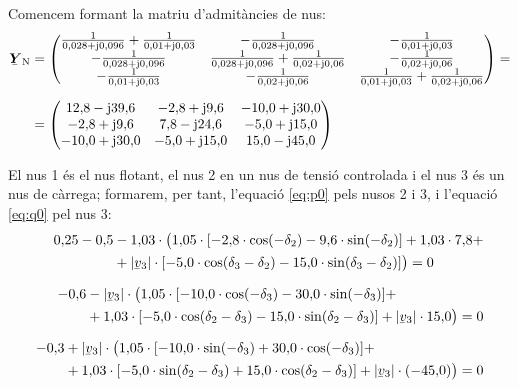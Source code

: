 \begin{exemple}
Comencem formant la matriu d'admit\`{a}ncies de nus:
\begin{align*}
\mcmplx{Y}\ped{N} &= \begin{pmatrix}
\frac{1}{0{,}028+\ju0{,}096} + \frac{1}{0{,}01+\ju0{,}03} & -\frac{1}{0{,}028+\ju0{,}096}  &  -\frac{1}{0{,}01+\ju0{,}03}\\
-\frac{1}{0{,}028+\ju0{,}096} & \frac{1}{0{,}028+\ju0{,}096} + \frac{1}{0{,}02+\ju0{,}06} &  -\frac{1}{0{,}02+\ju0{,}06}\\
-\frac{1}{0{,}01+\ju0{,}03} & -\frac{1}{0{,}02+\ju0{,}06} &
\frac{1}{0{,}01+\ju0{,}03} + \frac{1}{0{,}02+\ju0{,}06}
\end{pmatrix} = \\[1.5ex]
 &= \begin{pmatrix}
12{,}8 - \ju 39{,}6 & -2{,}8 + \ju 9{,}6 & -10{,}0 + \ju 30{,}0 \\
-2{,}8 + \ju 9{,}6 & 7{,}8 - \ju 24{,}6 & -5{,}0 + \ju 15{,}0 \\
-10{,}0 + \ju 30{,}0 & -5{,}0 + \ju 15{,}0 & 15{,}0 - \ju 45{,}0
\end{pmatrix}
\end{align*}

El nus 1 \'{e}s el nus flotant, el nus 2 en un nus de tensi\'{o} controlada
i el nus 3 \'{e}s un nus de c\`{a}rrega; formarem, per tant, l'equaci\'{o}
\eqref{eq:p0} pels nusos 2 i 3, i l'equaci\'{o} \eqref{eq:q0} pel nus 3:
\begin{align*}
\begin{split}
0{,}25-0{,}5 &- 1{,}03\cdot \bigl( 1{,}05\cdot [-2{,}8
\cdot\cos(-\delta_2) - 9{,}6
\cdot\sin( -\delta_2)]  + 1{,}03 \cdot 7{,}8 {}+ \\
&+ |\cmplx{v}_3|\cdot [-5{,}0 \cdot\cos(\delta_3-\delta_2) -
15{,}0\cdot \sin(\delta_3-\delta_2)]
 \bigr)  = 0 \end{split} \\[1.5ex]
\begin{split}
-0{,}6 &- |\cmplx{v}_3| \cdot \bigl( 1{,}05\cdot [-10{,}0
\cdot\cos(-\delta_3)
- 30{,}0\cdot\sin(-\delta_3)]  + \\
&+ 1{,}03\cdot [-5{,}0\cdot\cos(\delta_2-\delta_3) -
15{,}0\cdot\sin(\delta_2-\delta_3)]
 + |\cmplx{v}_3| \cdot15{,}0 \bigr)  = 0 \end{split}  \\[1.5ex]
\begin{split}
-0{,}3 &+ |\cmplx{v}_3|\cdot \bigl( 1{,}05
\cdot[-10{,}0\cdot\sin(-\delta_3) +
30{,}0\cdot\cos(-\delta_3)]  + \\
&+ 1{,}03 \cdot[-5{,}0\cdot\sin(\delta_2-\delta_3) +
15{,}0\cdot\cos(\delta_2-\delta_3)] + |\cmplx{v}_3|\cdot (-45{,}0)
\bigr)  = 0 \end{split}
\end{align*}


\end{exemple}
